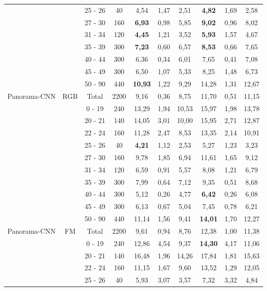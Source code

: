 \begin{table}[ht!]
{\begin{tabular}{|l|c|c|c|c|c|c|c|c|c|}
 &  & 25 - 26 & 40 & 4,54 & 1,47 & 2,51 & \textbf{4,82} & 1,69 & 2,58 \\
 &  & 27 - 30 & 160 & \textbf{6,93} & 0,98 & 5,85 & \textbf{9,02} & 0,96 & 8,02 \\
 &  & 31 - 34 & 120 & \textbf{4,45} & 1,21 & 3,52 & \textbf{5,93} & 1,57 & 4,67 \\
 &  & 35 - 39 & 300 & \textbf{7,23} & 0,60 & 6,57 & \textbf{8,53} & 0,66 & 7,65 \\
 &  & 40 - 44 & 300 & 6,36 & 0,34 & 6,01 & 7,65 & 0,41 & 7,08 \\
 &  & 45 - 49 & 300 & 6,50 & 1,07 & 5,33 & 8,25 & 1,48 & 6,73 \\
 &  & 50 - 90 & 440 & \textbf{10,93} & 1,22 & 9,29 & 14,28 & 1,31 & 12,67 \\ 
\hline
\multirow{11}{*}{Panorama-CNN} & \multirow{11}{*}{RGB} & Total & 2200 & 9,16 & 0,36 & 8,75 & 11,70 & 0,51 & 11,15 \\
 &  & 0 - 19 & 240 & 13,29 & 1,94 & 10,53 & 15,97 & 1,98 & 13,78 \\
 &  & 20 - 21 & 140 & 14,05 & 3,01 & 10,00 & 15,95 & 2,71 & 12,87 \\
 &  & 22 - 24 & 160 & 11,28 & 2,47 & 8,53 & 13,35 & 2,14 & 10,91 \\
 &  & 25 - 26 & 40 & \textbf{4,21} & 1,12 & 2,53 & 5,27 & 1,23 & 3,23 \\
 &  & 27 - 30 & 160 & 9,78 & 1,85 & 6,94 & 11,61 & 1,65 & 9,12 \\
 &  & 31 - 34 & 120 & 6,59 & 0,91 & 5,57 & 8,08 & 1,21 & 6,79 \\
 &  & 35 - 39 & 300 & 7,99 & 0,64 & 7,12 & 9,35 & 0,51 & 8,68 \\
 &  & 40 - 44 & 300 & 5,12 & 0,26 & 4,77 & \textbf{6,42} & 0,26 & 6,08 \\
 &  & 45 - 49 & 300 & 6,13 & 0,67 & 5,04 & 7,45 & 0,78 & 6,21 \\
 &  & 50 - 90 & 440 & 11,14 & 1,56 & 9,41 & \textbf{14,01} & 1,70 & 12,27 \\ 
\hline
\multirow{11}{*}{Panorama-CNN} & \multirow{11}{*}{FM} & Total & 2200 & 9,61 & 0,94 & 8,76 & 12,38 & 1,00 & 11,38 \\
 &  & 0 - 19 & 240 & 12,86 & 4,54 & 9,37 & \textbf{14,30} & 4,17 & 11,06 \\
 &  & 20 - 21 & 140 & 16,48 & 1,96 & 14,26 & 17,84 & 1,81 & 15,63 \\
 &  & 22 - 24 & 160 & 11,15 & 1,67 & 9,60 & 13,52 & 1,29 & 12,05 \\
 &  & 25 - 26 & 40 & 5,93 & 3,07 & 3,57 & 7,32 & 3,32 & 4,84 \\

\end{tabular}}
\end{table}
